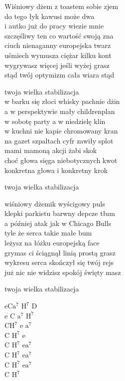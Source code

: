 \begin{text}
    Wiśniowy dżem z toastem sobie zjem\\
    do tego łyk kawusi może dwa\\
    i autko już do pracy wiezie mnie\\
    szczęśliwy ten co wartość swoją zna\\
    ciuch nienaganny europejska twarz\\
    uśmiech wymusza ciężar kilku kont\\
    wygrywasz więcej jeśli wyżej grasz\\
    stąd twój optymizm cała wiara stąd

    twoja wielka stabilizacja\\
    w barku się złoci whisky pachnie dżin\\
    a w perspektywie mały childrenplan\\
    w sobotę party a w niedzielę klin\\
    w kuchni nie kapie chromowany kran\\
    na gazet szpaltach cyfr zawiły splot\\
    mami mamoną akcji żabi skok\\
    choć głowa sięga niebotycznych kwot\\
    konkretna głowa i konkretny krok

    twoja wielka stabilizacja

    wiśniowy dżemik wyścigowy puls\\
    klepki parkietu barwny depcze tłum\\
    a później atak jak w Chicago Bulls\\
    tyle że serca takie małe bum\\
    leżysz na łóżku europejską face\\
    grymas ci ściągnął linią prostą grasz\\
    wykresu serca skończył się twój rejs\\
    już nic nie widzisz spokój święty masz

    twoja wielka stabilizacja
\end{text}
\begin{chord}
    eC$\mathrm{a^7}$ $\mathrm{H^7}$ D\\
    e C $\mathrm{a^7}$ $\mathrm{H^7}$\\
    C$\mathrm{H^7}$ e $\mathrm{a^7}$\\
    C $\mathrm{H^7}$ e\\
    C $\mathrm{H^7}$ e$\mathrm{a^7}$\\
    C $\mathrm{H^7}$ e$\mathrm{a^7}$\\
    C $\mathrm{H^7}$ e$\mathrm{a^7}$\\
    C $\mathrm{H^7}$
\end{chord}
